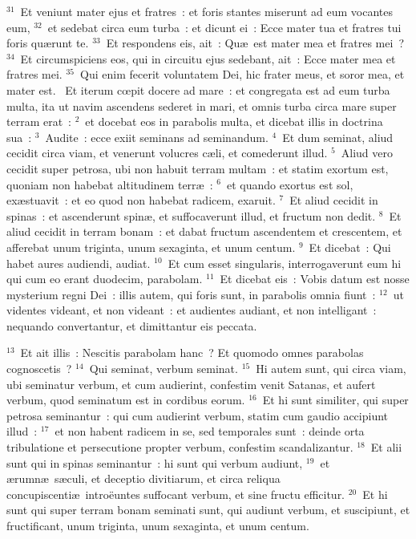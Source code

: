 ${}^{31}$~Et veniunt mater ejus et fratres~: et foris stantes miserunt ad eum vocantes eum,
${}^{32}$~et sedebat circa eum turba~: et dicunt ei~: Ecce mater tua et fratres tui foris qu\ae runt te.
${}^{33}$~Et respondens eis, ait~: Qu\ae\ est mater mea et fratres mei~?
${}^{34}$~Et circumspiciens eos, qui in circuitu ejus sedebant, ait~: Ecce mater mea et fratres mei.
${}^{35}$~Qui enim fecerit voluntatem Dei, hic frater meus, et soror mea, et mater est.
~\lettrine[lines=10,image=true,loversize=0.05,lraise=-0.03]{E}{}t iterum cœpit docere ad mare~: et congregata est ad eum turba multa, ita ut navim ascendens sederet in mari, et omnis turba circa mare super terram erat~:
${}^{2}$~et docebat eos in parabolis multa, et dicebat illis in doctrina sua~:
${}^{3}$~Audite~: ecce exiit seminans ad seminandum.
${}^{4}$~Et dum seminat, aliud cecidit circa viam, et venerunt volucres c\ae li, et comederunt illud.
${}^{5}$~Aliud vero cecidit super petrosa, ubi non habuit terram multam~: et statim exortum est, quoniam non habebat altitudinem terr\ae~:
${}^{6}$~et quando exortus est sol, ex\ae stuavit~: et eo quod non habebat radicem, exaruit.
${}^{7}$~Et aliud cecidit in spinas~: et ascenderunt spin\ae , et suffocaverunt illud, et fructum non dedit.
${}^{8}$~Et aliud cecidit in terram bonam~: et dabat fructum ascendentem et crescentem, et afferebat unum triginta, unum sexaginta, et unum centum.
${}^{9}$~Et dicebat~: Qui habet aures audiendi, audiat.
${}^{10}$~Et cum esset singularis, interrogaverunt eum hi qui cum eo erant duodecim, parabolam.
${}^{11}$~Et dicebat eis~: Vobis datum est nosse mysterium regni Dei~: illis autem, qui foris sunt, in parabolis omnia fiunt~:
${}^{12}$~ut videntes videant, et non videant~: et audientes audiant, et non intelligant~: nequando convertantur, et dimittantur eis peccata.


${}^{13}$~Et ait illis~: Nescitis parabolam hanc~? Et quomodo omnes parabolas cognoscetis~?
${}^{14}$~Qui seminat, verbum seminat.
${}^{15}$~Hi autem sunt, qui circa viam, ubi seminatur verbum, et cum audierint, confestim venit Satanas, et aufert verbum, quod seminatum est in cordibus eorum.
${}^{16}$~Et hi sunt similiter, qui super petrosa seminantur~: qui cum audierint verbum, statim cum gaudio accipiunt illud~:
${}^{17}$~et non habent radicem in se, sed temporales sunt~: deinde orta tribulatione et persecutione propter verbum, confestim scandalizantur.
${}^{18}$~Et alii sunt qui in spinas seminantur~: hi sunt qui verbum audiunt,
${}^{19}$~et \ae rumn\ae\ s\ae culi, et deceptio divitiarum, et circa reliqua concupiscenti\ae\ intro\"euntes suffocant verbum, et sine fructu efficitur.
${}^{20}$~Et hi sunt qui super terram bonam seminati sunt, qui audiunt verbum, et suscipiunt, et fructificant, unum triginta, unum sexaginta, et unum centum.


